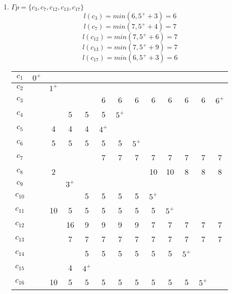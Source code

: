 \documentclass[12pt, a4paper] {ncc}
\begin{document}
\begin{enumerate}
	\item $\Gamma p = \{c_3, c_7, c_{12}, c_{13}, c_{17}\}$
	$$l(c_3)    = min(6, 5^+ + 3) = 6$$
	$$l(c_7)    = min(7, 5^+ + 4) = 7$$
	$$l(c_{12}) = min(7, 5^+ + 6) = 7$$
	$$l(c_{13}) = min(7, 5^+ + 9) = 7$$
	$$l(c_{17}) = min(6, 5^+ + 3) = 6$$
\begin{tabular} {|c|c|c|c|c|c|c|c|c|c|c|c|c|}
    \hline
    $c_{1}$  &$0^+$&      &     &     &     &     &     &      &     &     &     &       \\ \hline
    $c_{2}$  & \z  &$1^+$ &     &     &     &     &     &      &     &     &     &       \\ \hline
    $c_{3}$  & \z  & \z   & \z  &\z   & 6   &  6  &  6  &  6   & 6   & 6   & 6   &$6^+$     \\ \hline
    $c_{4}$  & \z  & \z   & 5   & 5   & 5   &$5^+$&     &      &     &     &     &       \\ \hline
    $c_{5}$  & \z  & 4    & 4   & 4   &$4^+$&     &     &      &     &     &     &       \\ \hline
    $c_{6}$  & \z  & 5    & 5   & 5   & 5   &  5  &$5^+$&      &     &     &     &       \\ \hline
    $c_{7}$  & \z  & \z   & \z  & \z  & 7   &  7  &  7  &  7   & 7   & 7   & 7   & 7     \\ \hline
    $c_{8}$  & \z  & 2    & \z  & \z  & \z  &  \z & \z  &  10  & 10  & 8   & 8   & 8     \\ \hline
    $c_{9}$  & \z  & \z   &$3^+$&     &     &     &     &      &     &     &     &       \\ \hline
    $c_{10}$ & \z  & \z   & \z  & 5   & 5   &  5  &  5  &$5^+$ &     &     &     &       \\ \hline
    $c_{11}$ & \z  & 10   &  5  & 5   & 5   &  5  &  5  &  5   &$5^+$&     &     &       \\ \hline
    $c_{12}$ & \z  & \z   & 16  & 9   & 9   &  9  &  9  &  7   & 7   & 7   & 7   & 7     \\ \hline
    $c_{13}$ & \z  & \z   & 7   & 7   & 7   &  7  &  7  &  7   & 7   & 7   & 7   & 7     \\ \hline
    $c_{14}$ & \z  & \z   & \z  & 5   & 5   &  5  &  5  &  5   & 5   &$5^+$&     &       \\ \hline
    $c_{15}$ & \z  & \z   & 4   &$4^+$&     &     &     &      &     &     &     &       \\ \hline
    $c_{16}$ & \z  & 10   & 5   & 5   & 5   &  5  &  5  &  5   & 5   & 5   &$5^+$&          \\ \hline

\end{tabular}
\end{enumerate}
\end{document}

